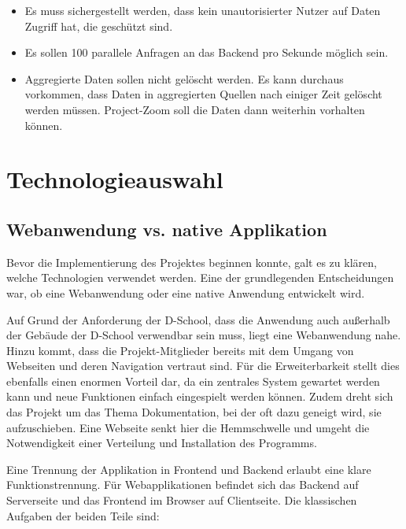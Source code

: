 \begin{itemize}
 \item Es muss sichergestellt werden, dass kein unautorisierter Nutzer auf Daten Zugriff hat, die geschützt sind.
 \item Es sollen 100 parallele Anfragen an das Backend pro Sekunde möglich sein.
  \item Aggregierte Daten sollen nicht gelöscht werden. Es kann durchaus vorkommen, dass Daten in aggregierten Quellen nach einiger Zeit gelöscht werden müssen. Project-Zoom soll die Daten dann weiterhin vorhalten können.
\end{itemize} 

\section{Technologieauswahl}
\subsection{Webanwendung vs. native Applikation}
Bevor die Implementierung des Projektes beginnen konnte, galt es zu klären, welche Technologien verwendet werden. Eine der grundlegenden Entscheidungen war, ob eine Webanwendung oder eine native Anwendung entwickelt wird. 

Auf Grund der Anforderung der D-School, dass die Anwendung auch außerhalb der Gebäude der D-School verwendbar sein muss, liegt eine Webanwendung nahe. Hinzu kommt, dass die Projekt-Mitglieder bereits mit dem Umgang von Webseiten und deren Navigation vertraut sind. Für die Erweiterbarkeit stellt dies ebenfalls einen enormen Vorteil dar, da ein zentrales System gewartet werden kann und neue Funktionen einfach eingespielt werden können. Zudem dreht sich das Projekt um das Thema Dokumentation, bei der oft dazu geneigt wird, sie aufzuschieben. Eine Webseite senkt hier die Hemmschwelle und umgeht die Notwendigkeit einer Verteilung und Installation des Programms.

Eine Trennung der Applikation in Frontend und Backend erlaubt eine klare Funktionstrennung. Für Webapplikationen befindet sich das Backend auf Serverseite und das Frontend im Browser auf Clientseite. Die klassischen Aufgaben der beiden Teile sind:

